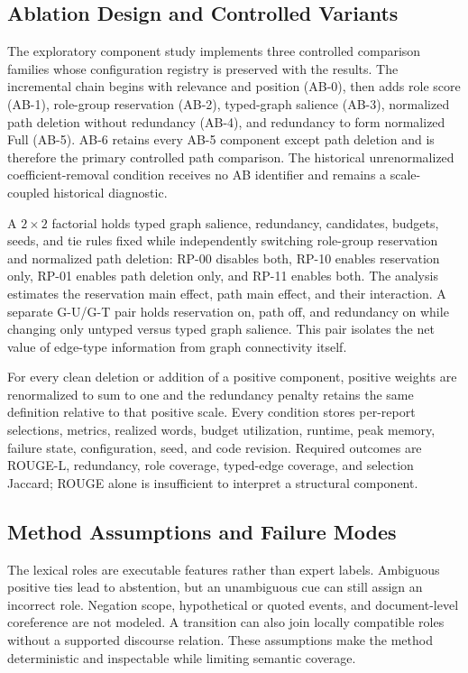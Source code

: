\documentclass[information,article,submit,moreauthors]{Definitions/mdpi}
\begin{document}
\subsection{Ablation Design and Controlled Variants}

The exploratory component study implements three controlled comparison families whose configuration registry is preserved with the results. The incremental chain begins with relevance and position (AB-0), then adds role score (AB-1), role-group reservation (AB-2), typed-graph salience (AB-3), normalized path deletion without redundancy (AB-4), and redundancy to form normalized Full (AB-5). AB-6 retains every AB-5 component except path deletion and is therefore the primary controlled path comparison. The historical unrenormalized coefficient-removal condition receives no AB identifier and remains a scale-coupled historical diagnostic.

A $2\times2$ factorial holds typed graph salience, redundancy, candidates, budgets, seeds, and tie rules fixed while independently switching role-group reservation and normalized path deletion: RP-00 disables both, RP-10 enables reservation only, RP-01 enables path deletion only, and RP-11 enables both. The analysis estimates the reservation main effect, path main effect, and their interaction. A separate G-U/G-T pair holds reservation on, path off, and redundancy on while changing only untyped versus typed graph salience. This pair isolates the net value of edge-type information from graph connectivity itself.

For every clean deletion or addition of a positive component, positive weights are renormalized to sum to one and the redundancy penalty retains the same definition relative to that positive scale. Every condition stores per-report selections, metrics, realized words, budget utilization, runtime, peak memory, failure state, configuration, seed, and code revision. Required outcomes are ROUGE-L, redundancy, role coverage, typed-edge coverage, and selection Jaccard; ROUGE alone is insufficient to interpret a structural component.

\subsection{Method Assumptions and Failure Modes}

The lexical roles are executable features rather than expert labels. Ambiguous positive ties lead to abstention, but an unambiguous cue can still assign an incorrect role. Negation scope, hypothetical or quoted events, and document-level coreference are not modeled. A transition can also join locally compatible roles without a supported discourse relation. These assumptions make the method deterministic and inspectable while limiting semantic coverage.
\end{document}
